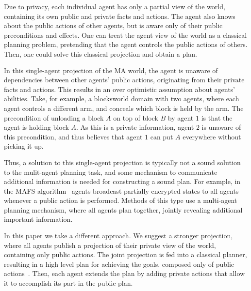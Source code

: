 \documentclass[letterpaper]{article}
\theoremstyle{definition}
\begin{document}
Due to privacy, each individual agent has only a partial view of the world, containing its own public and private facts and actions. The agent also knows about the public actions of other agents, but is aware only of their public preconditions and effects. One can treat the agent view of the world as a classical planning problem, pretending that the agent controls the public actions of others. Then, one could solve this classical projection and obtain a plan.

In this single-agent projection of the MA world, the agent is unaware of dependencies between other agents' public actions, originating from their private facts and actions. This results in an over optimistic assumption about agents' abilities. Take, for example, a blocksworld domain with two agents, where each agent controls a different arm, and conceals which block is held by the arm. The precondition of unloading a block $A$ on top of block $B$
by agent $1$ is that the agent is holding block $A$. As this is a private information, agent $2$ is unaware of this precondition, and thus believes that agent $1$ can put $A$ everywhere without picking it up.



Thus, a solution to this single-agent projection is typically not a sound solution to the mulit-agent planning task, and some mechanism to communicate additional information is needed for constructing a sound plan. For example, in the MAFS algorithm~\cite{nissim2014distributed} agents broadcast partially encrypted states to all agents whenever a public action is performed. Methods of this type use a multi-agent planning mechanism, where all agents plan together, jointly revealing additional important information.

In this paper we take a different approach. We suggest a stronger projection, where all agents publish a projection of their private view of the world, containing only public actions. The joint projection is fed into a classical planner, resulting in a high level plan for achieving the goals, composed only of public actions~\cite{brafman2008one,maliah2014privacyPreserving}. Then, each agent extends the plan by adding private actions that allow it to accomplish its part in the public plan.
\end{document}
